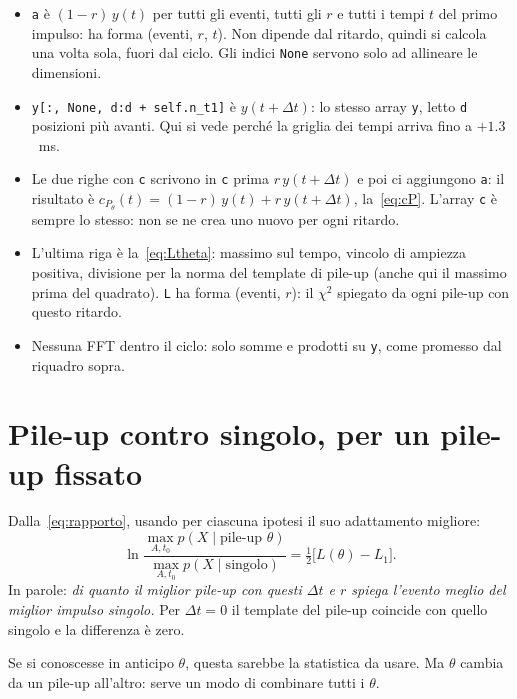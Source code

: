 \documentclass[11pt,a4paper]{article}
\newcommand{\dt}{\Delta t}
\begin{document}
\begin{itemize}
  \item \texttt{a} è $(1-r)\,y(t)$ per tutti gli eventi, tutti gli $r$ e tutti i tempi $t$ del
    primo impulso: ha forma (eventi, $r$, $t$). Non dipende dal ritardo, quindi si calcola una
    volta sola, fuori dal ciclo. Gli indici \texttt{None} servono solo ad allineare le dimensioni.
  \item \texttt{y[:, None, d:d + self.n\_t1]} è $y(t+\dt)$: lo stesso array \texttt{y}, letto
    \texttt{d} posizioni più avanti. Qui si vede perché la griglia dei tempi arriva fino a
    $+1.3$~ms.
  \item Le due righe con \texttt{c} scrivono in \texttt{c} prima $r\,y(t+\dt)$ e poi ci
    aggiungono \texttt{a}: il risultato è $c_{P_\theta}(t) = (1-r)\,y(t) + r\,y(t+\dt)$,
    la~\eqref{eq:cP}. L'array \texttt{c} è sempre lo stesso: non se ne crea uno nuovo per ogni
    ritardo.
  \item L'ultima riga è la~\eqref{eq:Ltheta}: massimo sul tempo, vincolo di ampiezza positiva,
    divisione per la norma del template di pile-up (anche qui il massimo prima del quadrato).
    \texttt{L} ha forma (eventi, $r$): il $\chi^2$ spiegato da ogni pile-up con questo ritardo.
  \item Nessuna FFT dentro il ciclo: solo somme e prodotti su \texttt{y}, come promesso dal
    riquadro sopra.
\end{itemize}

\section{Pile-up contro singolo, per un pile-up fissato}
Dalla~\eqref{eq:rapporto}, usando per ciascuna ipotesi il suo adattamento migliore:
\begin{equation}
  \ln \frac{\max_{A,t_0} p(X\mid \text{pile-up } \theta)}{\max_{A,t_0} p(X\mid \text{singolo})}
  = \tfrac12\Big[L(\theta) - L_1\Big].
  \label{eq:LRtheta}
\end{equation}
In parole: \emph{di quanto il miglior pile-up con questi $\dt$ e $r$ spiega l'evento meglio del
miglior impulso singolo.} Per $\dt = 0$ il template del pile-up coincide con quello singolo e la
differenza è zero.

Se si conoscesse in anticipo $\theta$, questa sarebbe la statistica da usare. Ma $\theta$ cambia da
un pile-up all'altro: serve un modo di combinare tutti i $\theta$.
\end{document}
